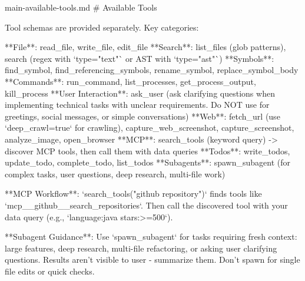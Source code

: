\begin{prompttemplate}{main-available-tools.md}
# Available Tools

Tool schemas are provided separately. Key categories:

**File**: read_file, write_file, edit_file
**Search**: list_files (glob patterns), search (regex with `type="text"`
  or AST with `type="ast"`)
**Symbols**: find_symbol, find_referencing_symbols, rename_symbol,
  replace_symbol_body
**Commands**: run_command, list_processes, get_process_output, kill_process
**User Interaction**: ask_user (ask clarifying questions when implementing
  technical tasks with unclear requirements. Do NOT use for greetings,
  social messages, or simple conversations)
**Web**: fetch_url (use `deep_crawl=true` for crawling),
  capture_web_screenshot, capture_screenshot, analyze_image, open_browser
**MCP**: search_tools (keyword query) -> discover MCP tools, then call
  them with data queries
**Todos**: write_todos, update_todo, complete_todo, list_todos
**Subagents**: spawn_subagent (for complex tasks, user questions, deep
  research, multi-file work)

**MCP Workflow**: `search_tools("github repository")` finds tools like
`mcp__github__search_repositories`. Then call the discovered tool with
your data query (e.g., `language:java stars:>=500`).

**Subagent Guidance**: Use `spawn_subagent` for tasks requiring fresh
context: large features, deep research, multi-file refactoring, or asking
user clarifying questions. Results aren't visible to user - summarize
them. Don't spawn for single file edits or quick checks.
\end{prompttemplate}

